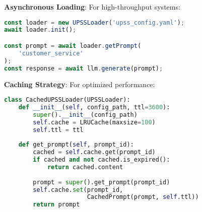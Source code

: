 \textbf{Asynchronous Loading}: For high-throughput systems:

\begin{lstlisting}[language=JavaScript,caption=Async Integration]
const loader = new UPSSLoader('upss_config.yaml');
await loader.init();

const prompt = await loader.getPrompt(
    'customer_service'
);
const response = await llm.generate(prompt);
\end{lstlisting}

\textbf{Caching Strategy}: For optimized performance:

\begin{lstlisting}[language=Python,caption=Caching Implementation]
class CachedUPSSLoader(UPSSLoader):
    def __init__(self, config_path, ttl=3600):
        super().__init__(config_path)
        self.cache = LRUCache(maxsize=100)
        self.ttl = ttl
    
    def get_prompt(self, prompt_id):
        cached = self.cache.get(prompt_id)
        if cached and not cached.is_expired():
            return cached.content
        
        prompt = super().get_prompt(prompt_id)
        self.cache.set(prompt_id, 
                       CachedPrompt(prompt, self.ttl))
        return prompt
\end{lstlisting}
